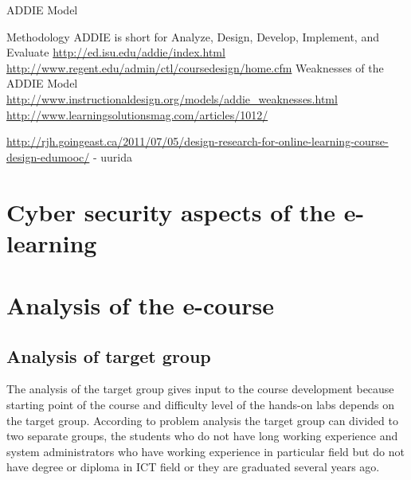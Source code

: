  \gls{ADDIE Model}

Methodology 
ADDIE is short for Analyze, Design, Develop, Implement, and Evaluate \url{http://ed.isu.edu/addie/index.html}
\url{http://www.regent.edu/admin/ctl/coursedesign/home.cfm}
Weaknesses of the ADDIE Model \url{http://www.instructionaldesign.org/models/addie_weaknesses.html}
\url{http://www.learningsolutionsmag.com/articles/1012/}

\url{http://rjh.goingeast.ca/2011/07/05/design-research-for-online-learning-course-design-edumooc/} - uurida


\section{Cyber security aspects of the e-learning}

\section{Analysis of the e-course}
\subsection{Analysis of target group}
The analysis of the target group gives input to the course development because starting point of the course and difficulty level of the hands-on labs depends on the target group. According to problem analysis the target group can divided to two separate groups, the students who do not have long working experience and system administrators who have working experience in particular field but do not have degree or diploma in \gls{ICT} field or they are graduated several years ago.


